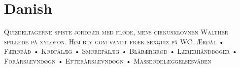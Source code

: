 

\presection\section*{\checkyes Danish}\postsection

\textsc{Quizdeltagerne spiste jordbær med fløde, 
mens cirkusklovnen Walther spillede på xylofon. 
Høj bly gom vandt fræk sexquiz på WC.
Ærøål • Færøbåd • Kødpålæg • Smørepålæg • Blåbærgrød • Lærerhåndbøger • 
Forårsjævndøgn • Efterårsjævndøgn • Masseødelæggelsesvåben}